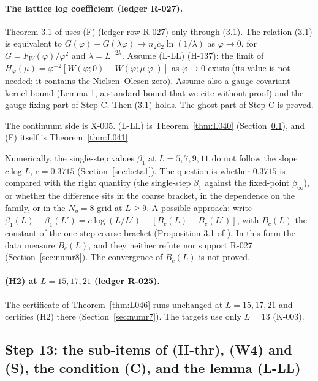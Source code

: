\paragraph{The lattice log coefficient (ledger R-027).}
\begin{proposition}\label{src:T2-F-STEPB}
Theorem 3.1 of  uses (F) (ledger row R-027) only through (3.1). The relation (3.1) is equivalent to $G(\varphi)-G(\lambda\varphi)\to n_2c_2\ln(1/\lambda)$ as $\varphi\to0$, for $G=F_W(\varphi)/\varphi^2$ and $\lambda=L^{-2k}$. Assume (L-LL) (H-137): the limit of $H_\varphi(\mu)=\varphi^{-2}[W(\varphi;0)-W(\varphi;\mu|\varphi|)]$ as $\varphi\to0$ exists (its value is not needed; it contains the Nielsen--Olesen zero). Assume also a gauge-covariant kernel bound (Lemma 1, a standard bound that we cite without proof) and the gauge-fixing part of Step C. Then (3.1) holds. The ghost part of Step C is proved.
\end{proposition}
The continuum side is X-005. (L-LL) is Theorem~\ref{thm:L040} (Section~\ref{sec:src-r8}), and (F) itself is Theorem~\ref{thm:L041}.

\begin{remark}
Numerically, the single-step values $\beta_1$ at $L=5,7,9,11$ do not follow the slope $c\log L$, $c=0.3715$ (Section~\ref{sec:beta1}). The question is whether $0.3715$ is compared with the right quantity (the single-step $\beta_1$ against the fixed-point $\beta_\infty$), or whether the difference sits in the coarse bracket, in the dependence on the family, or in the $N_g=8$ grid at $L\ge9$. A possible approach: write $\beta_1(L)-\beta_1(L')=c\log(L/L')-[B_c(L)-B_c(L')]$, with $B_c(L)$ the constant of the one-step coarse bracket (Proposition 3.1 of ). In this form the data measure $B_c(L)$, and they neither refute nor support R-027 (Section~\ref{sec:numr8}). The convergence of $B_c(L)$ is not proved.
\end{remark}

\paragraph{(H2) at $L=15,17,21$ (ledger R-025).} The certificate of Theorem~\ref{thm:L046} runs unchanged at $L=15,17,21$ and certifies (H2) there (Section~\ref{sec:numr7}). The targets use only $L=13$ (K-003).

\subsection{Step 13: the sub-items of (H-thr), (W4) and (S), the condition (C), and the lemma (L-LL)}\label{sec:src-r8}

